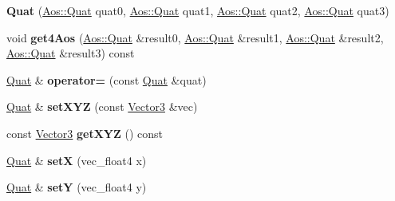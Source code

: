 \begin{DoxyCompactItemize}
\item 
\hypertarget{classVectormath_1_1Soa_1_1Quat_a685f312becedbdf998ad9bb5aa4a5de4}{{\bfseries Quat} (\hyperlink{classVectormath_1_1Aos_1_1Quat}{Aos\-::\-Quat} quat0, \hyperlink{classVectormath_1_1Aos_1_1Quat}{Aos\-::\-Quat} quat1, \hyperlink{classVectormath_1_1Aos_1_1Quat}{Aos\-::\-Quat} quat2, \hyperlink{classVectormath_1_1Aos_1_1Quat}{Aos\-::\-Quat} quat3)}\label{classVectormath_1_1Soa_1_1Quat_a685f312becedbdf998ad9bb5aa4a5de4}

\item 
\hypertarget{classVectormath_1_1Soa_1_1Quat_a188292ca81f5622822bfd7af34412346}{void {\bfseries get4\-Aos} (\hyperlink{classVectormath_1_1Aos_1_1Quat}{Aos\-::\-Quat} \&result0, \hyperlink{classVectormath_1_1Aos_1_1Quat}{Aos\-::\-Quat} \&result1, \hyperlink{classVectormath_1_1Aos_1_1Quat}{Aos\-::\-Quat} \&result2, \hyperlink{classVectormath_1_1Aos_1_1Quat}{Aos\-::\-Quat} \&result3) const }\label{classVectormath_1_1Soa_1_1Quat_a188292ca81f5622822bfd7af34412346}

\item 
\hypertarget{classVectormath_1_1Soa_1_1Quat_aeeb93a43439ca30c5744ff00f51d447f}{\hyperlink{classVectormath_1_1Soa_1_1Quat}{Quat} \& {\bfseries operator=} (const \hyperlink{classVectormath_1_1Soa_1_1Quat}{Quat} \&quat)}\label{classVectormath_1_1Soa_1_1Quat_aeeb93a43439ca30c5744ff00f51d447f}

\item 
\hypertarget{classVectormath_1_1Soa_1_1Quat_a87c7972c9501bdc3bc2a6e73a68a0bf0}{\hyperlink{classVectormath_1_1Soa_1_1Quat}{Quat} \& {\bfseries set\-X\-Y\-Z} (const \hyperlink{classVectormath_1_1Soa_1_1Vector3}{Vector3} \&vec)}\label{classVectormath_1_1Soa_1_1Quat_a87c7972c9501bdc3bc2a6e73a68a0bf0}

\item 
\hypertarget{classVectormath_1_1Soa_1_1Quat_af4cd3937a54a436553611066a5eaf746}{const \hyperlink{classVectormath_1_1Soa_1_1Vector3}{Vector3} {\bfseries get\-X\-Y\-Z} () const }\label{classVectormath_1_1Soa_1_1Quat_af4cd3937a54a436553611066a5eaf746}

\item 
\hypertarget{classVectormath_1_1Soa_1_1Quat_a73b507f169215662dfef25f67b03784a}{\hyperlink{classVectormath_1_1Soa_1_1Quat}{Quat} \& {\bfseries set\-X} (vec\-\_\-float4 x)}\label{classVectormath_1_1Soa_1_1Quat_a73b507f169215662dfef25f67b03784a}

\item 
\hypertarget{classVectormath_1_1Soa_1_1Quat_a057c3efc4c761fc1771c24bd482060d2}{\hyperlink{classVectormath_1_1Soa_1_1Quat}{Quat} \& {\bfseries set\-Y} (vec\-\_\-float4 y)}\label{classVectormath_1_1Soa_1_1Quat_a057c3efc4c761fc1771c24bd482060d2}


\end{DoxyCompactItemize}
